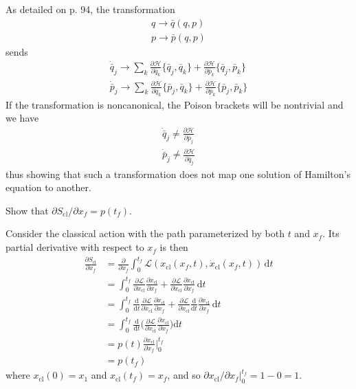 \documentclass[../principles-of-quantum-mechanics.tex]{subfiles}
\begin{document}
\begin{questions}
		\begin{solution}
			As detailed on p. 94, the transformation 
			\begin{gather*}
				q \to \bar{q}(q, p) \\
				p \to \bar{p}(q, p)
			\end{gather*}
			sends
			\begin{gather*}
				\dot{\bar{q}}_j \to \sum_k \frac{\partial\mathcal{H}}{\partial \bar{q}_k}\{\bar{q}_j, \bar{q}_k\} + \frac{\partial\mathcal{H}}{\partial \bar{p}_k}\{\bar{q}_j, \bar{p}_k\} \\
				\dot{\bar{p}}_j \to \sum_k \frac{\partial\mathcal{H}}{\partial \bar{q}_k}\{\bar{p}_j, \bar{q}_k\} + \frac{\partial\mathcal{H}}{\partial \bar{p}_k}\{\bar{p}_j, \bar{p}_k\}
			\end{gather*}
			If the transformation is noncanonical, the Poison brackets will be nontrivial and we have
			\begin{gather*}
				\dot{\bar{q}}_j \neq \frac{\partial\mathcal{H}}{\partial \bar{p}_j} \\
				\dot{\bar{p}}_j \neq \frac{\partial\mathcal{H}}{\partial \bar{q}_j}
			\end{gather*}
			thus showing that such a transformation does not map one solution of Hamilton's equation to another.
		\end{solution}
		
		\question Show that $\partial S_{\text{cl}}/\partial x_f = p(t_f)$.
		
		\begin{solution}
			Consider the classical action with the path parameterized by both $t$ and $x_f$. Its partial derivative with respect to $x_f$ is then
			\begin{align*}
				\frac{\partial S_{\text{cl}}}{\partial x_f} &= \frac{\partial}{\partial x_f}\int_0^{t_f}\mathcal{L}(x_{\text{cl}}(x_f, t), \dot{x}_{\text{cl}}(x_f, t))\,\mathrm{d}t \\
				&= \int_0^{t_f}\frac{\partial \mathcal{L}}{\partial x_{\text{cl}}}\frac{\partial x_{\text{cl}}}{\partial x_f} + \frac{\partial \mathcal{L}}{\partial \dot{x}_{\text{cl}}}\frac{\partial \dot{x}_{\text{cl}}}{\partial x_f}\,\mathrm{d}t \\
				&= \int_0^{t_f}\frac{\mathrm{d}}{\mathrm{d}t}\frac{\partial \mathcal{L}}{\partial \dot{x}_{\text{cl}}}\frac{\partial x_{\text{cl}}}{\partial x_f} + \frac{\partial \mathcal{L}}{\partial \dot{x}_{\text{cl}}}\frac{\mathrm{d}}{\mathrm{d}t}\frac{\partial x_{\text{cl}}}{\partial x_f}\,\mathrm{d}t \\
				&= \int_0^{t_f}\frac{\mathrm{d}}{\mathrm{d}t}\Big(\frac{\partial \mathcal{L}}{\partial \dot{x}_{\text{cl}}}\frac{\partial x_{\text{cl}}}{\partial x_f}\Big)\mathrm{d}t \\
				&= p(t)\frac{\partial x_{\text{cl}}}{\partial x_f}\Big|_0^{t_f} \\
				&= p(t_f)
			\end{align*}
			where $x_{\text{cl}}(0) = x_1$ and $x_{\text{cl}}(t_f) = x_f$, and so $\partial x_{\text{cl}}/\partial x_f|_0^{t_f} = 1 - 0 = 1$.
		\end{solution}
		

\end{questions}
\end{document}
